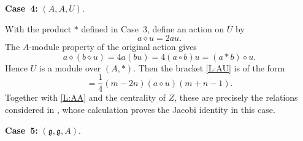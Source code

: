 \documentclass[12pt]{article}
\numberwithin{equation}{section}
\theoremstyle{definition}
\theoremstyle{plain}
\newcommand{\afCase}[1]{\textbf{Case~#1:}}
\newcommand{\fg}{\mathfrak{g}}
\begin{document}
\afCase{4} $(A,A,U)$.  

With the product $*$ defined in Case~3, define an action on $U$ by
\begin{equation*}
    a\diamond u=2au.
\end{equation*}
The $A$-module property of the original action gives
\begin{equation*}
    a\diamond(b\diamond u)=4a(bu)=4(a\circ b)u=(a*b)\diamond u.
\end{equation*}
Hence $U$ is a module over $(A,*)$. Then the bracket \eqref{L:AU} is of the form
\begin{equation*}
    [a(m),u(n)]=\frac14(m-2n)(a\diamond u)(m+n-1).
\end{equation*}
Together with \eqref{L:AA} and the centrality of $Z$, these are precisely the relations considered in \cite[proof of Theorem~4.1, Case~2]{LY}, whose calculation proves the Jacobi identity in this case.

\afCase{5} $(\fg,\fg,A)$.
\end{document}

